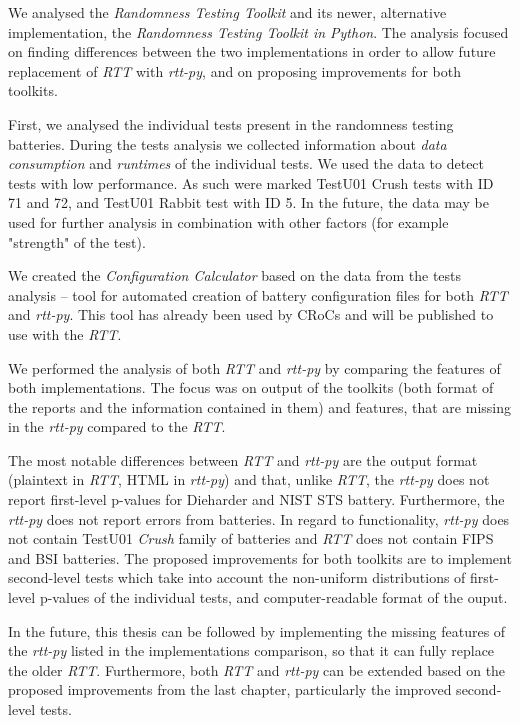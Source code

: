 \documentclass[
  digital,     %
  oneside,     %
  nosansbold,  %
  nocolorbold, %
  nolof,         %
  nolot,         %
]{fithesis4}
\begin{document}
We analysed the \emph{Randomness Testing Toolkit} and its newer, alternative implementation, the \emph{Randomness Testing Toolkit in Python}. The analysis focused on finding differences between the two implementations in order to allow future replacement of \emph{RTT} with \emph{rtt-py}, and on proposing improvements for both toolkits.

First, we analysed the individual tests present in the randomness testing batteries. During the tests analysis we collected information about \emph{data consumption} and \emph{runtimes} of the individual tests. We used the data to detect tests with low performance. As such were marked TestU01 Crush tests with ID 71 and 72, and TestU01 Rabbit test with ID 5. In the future, the data may be used for further analysis in combination with other factors (for example "strength" of the test).

We created the \emph{Configuration Calculator} based on the data from the tests analysis -- tool for automated creation of battery configuration files for both \emph{RTT} and \emph{rtt-py}. This tool has already been used by CRoCs and will be published to use with the \emph{RTT}.

We performed the analysis of both \emph{RTT} and \emph{rtt-py} by comparing the features of both implementations. The focus was on output of the toolkits (both format of the reports and the information contained in them) and features, that are missing in the \emph{rtt-py} compared to the \emph{RTT}.

 The most notable differences between \emph{RTT} and \emph{rtt-py} are the output format (plaintext in \emph{RTT}, HTML in \emph{rtt-py}) and that, unlike \emph{RTT}, the \emph{rtt-py} does not report first-level p-values for Dieharder and NIST STS battery. Furthermore, the \emph{rtt-py} does not report errors from batteries. In regard to functionality, \emph{rtt-py} does not contain TestU01 \emph{Crush} family of batteries and \emph{RTT} does not contain FIPS and BSI batteries. The proposed improvements for both toolkits are to implement second-level tests which take into account the non-uniform distributions of first-level p-values of the individual tests, and computer-readable format of the ouput. 

In the future, this thesis can be followed by implementing the missing features of the \emph{rtt-py} listed in the implementations comparison, so that it can fully replace the older \emph{RTT}. Furthermore, both \emph{RTT} and \emph{rtt-py} can be extended based on the proposed improvements from the last chapter, particularly the improved second-level tests. 
\end{document}
